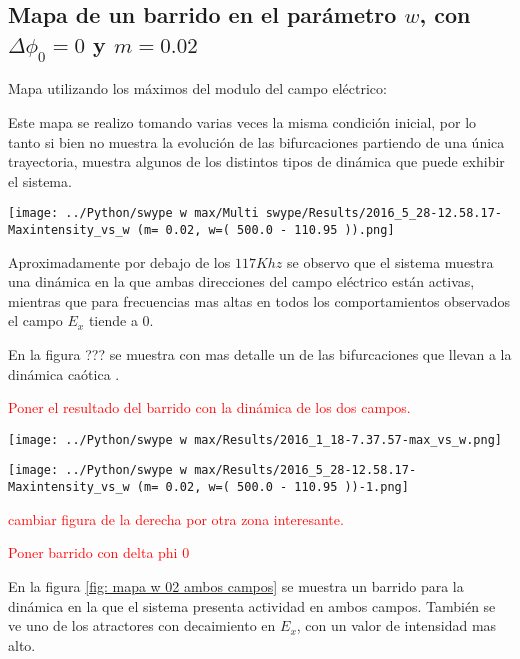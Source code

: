 		
		
		\subsection{Mapa de un barrido en el parámetro $w$, con $\Delta \phi_0 =0 $ y $m=0.02$}
		
		Mapa utilizando los máximos del modulo del campo eléctrico:
		
		Este mapa se realizo tomando varias veces la misma condición inicial, por lo tanto si bien no muestra la evolución de las bifurcaciones partiendo de una única trayectoria, muestra algunos de los distintos tipos de dinámica que puede exhibir el sistema.
		
		\begin{center}
			\texttt{[image: ../Python/swype w max/Multi swype/Results/2016\_5\_28-12.58.17-Maxintensity\_vs\_w (m= 0.02, w=( 500.0 - 110.95 )).png]}
			\label{mapa 2 02}
		\end{center}
		
		Aproximadamente por debajo de los $117 Khz$ se observo que el sistema muestra una dinámica en la que ambas direcciones del campo eléctrico están activas, mientras que para frecuencias mas altas en todos los comportamientos observados el campo $E_x$ tiende a $0$.
		
		En la figura ??? se muestra con mas detalle un de las  bifurcaciones que llevan a la dinámica caótica .
		
		\textcolor{red}{Poner el resultado del barrido con la dinámica de los dos campos.}
		
		\begin{minipage}{0.5\textwidth}
			\centering
			\texttt{[image: ../Python/swype w max/Results/2016\_1\_18-7.37.57-max\_vs\_w.png]}
		\end{minipage}
		\begin{minipage}{0.5\textwidth}
			\centering
			\texttt{[image: ../Python/swype w max/Results/2016\_5\_28-12.58.17-Maxintensity\_vs\_w (m= 0.02, w=( 500.0 - 110.95 ))-1.png]}
		\end{minipage}
		
		\textcolor{red}{cambiar figura de la derecha por otra zona interesante.}	
			
		\textcolor{red}{Poner barrido con delta phi 0 }	
		
		En la figura \ref{fig: mapa w 02 ambos campos} se muestra un barrido para la dinámica en la que el sistema presenta actividad en ambos campos.
		También se ve uno de los atractores con decaimiento en $E_x$, con un valor de intensidad mas alto.
		
